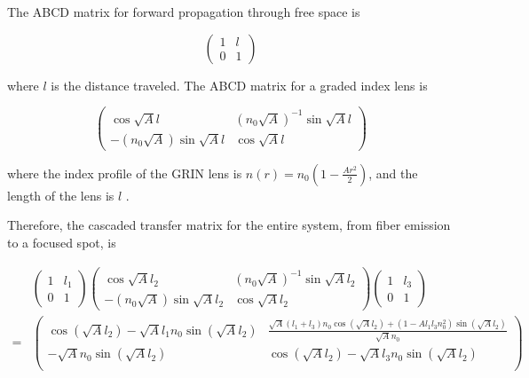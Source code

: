 The ABCD matrix for forward propagation through free space is

\begin{equation}
 \left( \begin{array}{cc}
1 & l \\
0 & 1 \end{array} \right)
\end{equation}

\noindent where $l$ is the distance traveled. The ABCD matrix for a graded index lens is

\begin{equation}
\left( \begin{array}{cc}
\cos{\sqrt{A} l} & (n_0 \sqrt{A})^{-1} \sin{\sqrt{A} l} \\
-(n_0 \sqrt{A}) \sin{\sqrt{A} l} & \cos{\sqrt{A} l} \end{array} \right)
\end{equation}

\noindent where the index profile of the GRIN lens is $n(r) = n_0 (1 - \frac{A r^2}{2})$, and the length of the lens is $l$ \cite{Siegman}.

Therefore, the cascaded transfer matrix for the entire system, from fiber emission to a focused spot, is 

\begin{equation}
\begin{aligned}
 & \left( \begin{array}{cc}
1 & l_1 \\
0 & 1 \end{array} \right)
\left( \begin{array}{cc}
\cos{\sqrt{A} l_2} & (n_0 \sqrt{A})^{-1} \sin{\sqrt{A} l_2} \\
-(n_0 \sqrt{A}) \sin{\sqrt{A} l_2} & \cos{\sqrt{A} l_2} \end{array} \right)
\left( \begin{array}{cc}
1 & l_3 \\
0 & 1 \end{array} \right) \\
= & 
\left(
\begin{array}{cc}
 \cos \left(\sqrt{A} l_2\right)-\sqrt{A} l_1 n_0 \sin
   \left(\sqrt{A} l_2 \right) & \frac{\sqrt{A} (l_1+ l_3)
   n_0 \cos \left(\sqrt{A} l_2 \right)+\left(1-A l_1 l_3
   n_0^2\right) \sin \left(\sqrt{A} l_2 \right)}{\sqrt{A} n_0}
   \\
 -\sqrt{A} n_0 \sin \left(\sqrt{A} l_2 \right) & \cos \left(\sqrt{A}
   l_2 \right)-\sqrt{A} l_3 n_0 \sin \left(\sqrt{A}
   l_2 \right) \\
\end{array}
\right)
\end{aligned}
\end{equation}

